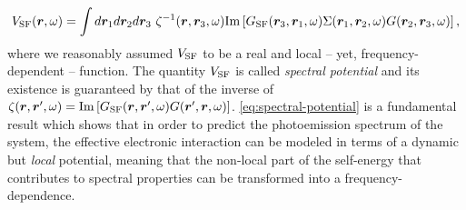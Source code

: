 %
\begin{equation}
    V_{\rm SF}({\bm r},\omega) = \int d{\bm r}_1 d{\bm r}_2 d{\bm r}_3 \ \zeta^{-1}({\bm r},{\bm r}_3,\omega) {\rm Im} \left[ G_{\rm SF}({\bm r}_3,{\bm r}_1,\omega) \Sigma({\bm r}_1,{\bm r}_2,\omega) G({\bm r}_2,{\bm r}_3,\omega) \right] ,
    \label{eq:spectral-potential}
\end{equation}
%
where we reasonably assumed $V_{\rm SF}$ to be a real and local -- yet, frequency-dependent -- function. The quantity $V_{\rm SF}$ is called \emph{spectral potential} and its existence is guaranteed by that of the inverse of $\zeta({\bm r},{\bm r}',\omega) = {\rm Im} \left[ G_{\rm SF}({\bm r},{\bm r}',\omega) G({\bm r}',{\bm r},\omega) \right]$. \cref{eq:spectral-potential} is a fundamental result which shows that in order to predict the photoemission spectrum of the system, the effective electronic interaction can be modeled in terms of a dynamic but \emph{local} potential, meaning that the non-local part of the self-energy that contributes to spectral properties can be transformed into a frequency-dependence.

